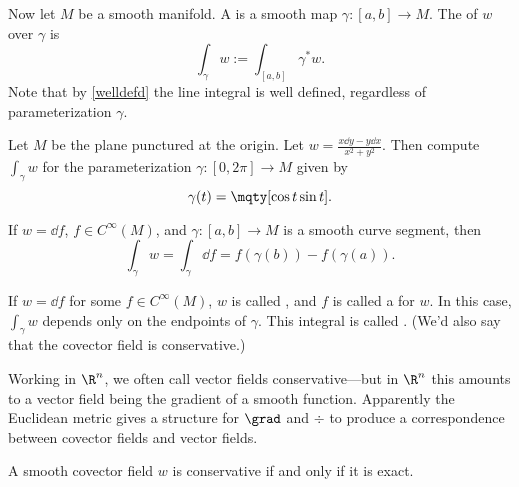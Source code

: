 \begin{defn}[]
    Now let $M$ be a smooth manifold. A  is a smooth map $\gamma \colon [a,b] \to M$. The  of $w$ over $\gamma$ is
    \begin{equation*}
        \int_\gamma w := \int_{[a,b]} \gamma^* w.
    \end{equation*}
    Note that by \ref{welldefd} the line integral is well defined, regardless of parameterization $\gamma$.
\end{defn}

\begin{todo}[]
    Let $M$ be the plane punctured at the origin. Let $w = \frac{x \dd{y} - y \dd{x} }{x^2 + y^2}$. Then compute $\int_\gamma w$ for the parameterization $\gamma \colon [0, 2\pi] \to M$ given by 
    \begin{equation*}
        \gamma(t) = \mqty[\cos t\\ \sin t].
    \end{equation*}
\end{todo}

\begin{thm}
    If $w = \dd{f}$, $f \in C^\infty(M)$, and $\gamma \colon [a,b]\to M$ is a smooth curve segment, then 
    \begin{equation*}
        \int_\gamma w = \int_\gamma \dd{f} = f(\gamma(b)) - f(\gamma(a)).
    \end{equation*}
\end{thm}

If $w = \dd{f}$ for some $f \in C^\infty(M)$, $w$ is called , and $f$ is called a  for $w$. In this case, $\int_\gamma w$ depends only on the endpoints of $\gamma$. This integral is called . (We'd also say that the covector field is conservative.)

\begin{note}[]
    Working in $\R^n$, we often call vector fields conservative---but in $\R^n$ this amounts to a vector field being the gradient of a smooth function. Apparently the Euclidean metric gives a structure for $\grad$ and $\div$ to produce a correspondence between covector fields and vector fields.
\end{note}

\begin{thm}[]
    A smooth covector field $w$ is conservative if and only if it is exact.
\end{thm}

